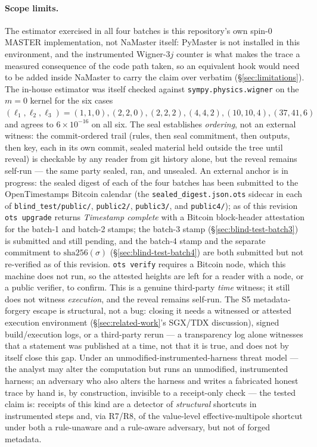 \documentclass[11pt]{article}
\begin{document}
\paragraph{Scope limits.} The estimator exercised in all four batches is this
repository's own spin-0 MASTER implementation, not NaMaster itself: PyMaster
is not installed in this environment, and the instrumented Wigner-3\(j\)
counter is what makes the trace a measured consequence of the code path
taken, so an equivalent hook would need to be added inside NaMaster to carry
the claim over verbatim (\S\ref{sec:limitations}). The in-house
estimator was itself checked against \texttt{sympy.physics.wigner} on the
\(m=0\) kernel for the six cases \((\ell_1,\ell_2,\ell_3) =
(1,1,0),(2,2,0),(2,2,2),(4,4,2),(10,10,4),(37,41,6)\) and agrees to
\(6\times10^{-16}\) on all six. The seal
establishes \emph{ordering}, not an external witness: the commit-ordered
trail (rules, then seal commitment, then outputs, then key, each in its own
commit, sealed material held outside the tree until reveal) is checkable by
any reader from git history alone, but the reveal remains self-run --- the
same party sealed, ran, and unsealed. An external anchor is in progress: the
sealed digest of each of the four batches has been submitted to the
OpenTimestamps Bitcoin calendar (the \texttt{sealed\_digest.json.ots} sidecar
in each of \texttt{blind\_test/public/}, \texttt{public2/}, \texttt{public3/},
and \texttt{public4/}); as of
this revision \texttt{ots upgrade} returns \emph{Timestamp complete} with a
Bitcoin block-header attestation for the batch-1 and batch-2 stamps; the
batch-3 stamp (\S\ref{sec:blind-test-batch3}) is submitted and still pending,
and the batch-4 stamp and the separate commitment to \(\mathrm{sha256}(\sigma)\)
(\S\ref{sec:blind-test-batch4}) are both submitted but not re-verified as of
this revision.
\texttt{ots verify} requires a Bitcoin node, which this machine does not run,
so the attested heights are left for a reader with a node, or a public
verifier, to confirm. This is a genuine third-party \emph{time} witness; it
still does not witness \emph{execution}, and the reveal remains self-run.
The S5 metadata-forgery escape is
structural, not a bug: closing it needs a witnessed or attested execution
environment (\S\ref{sec:related-work}'s SGX/TDX discussion), signed
build/execution logs, or a third-party rerun --- a transparency log alone
witnesses that a statement was published at a time, not that it is true, and
does not by itself close this gap. Under an unmodified-instrumented-harness threat model ---
the analyst may alter the computation but runs an unmodified, instrumented
harness; an adversary who also alters the harness and writes a fabricated
honest trace by hand is, by construction, invisible to a receipt-only check
--- the tested claim is: receipts of this kind are a detector of
\emph{structural} shortcuts in instrumented steps and, via R7/R8, of the
value-level effective-multipole shortcut under both a rule-unaware and a
rule-aware adversary, but not of forged metadata.
\end{document}
